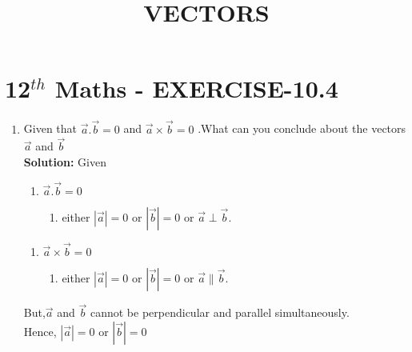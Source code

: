 \documentclass[10pt]{article}
\newcommand{\solution}{\noindent \textbf{Solution: }}
\providecommand{\abs}[1]{\left\vert#1\right\vert}
\begin{document}
\begin{center}
\title{\textbf{VECTORS}}
\date{\vspace{-5ex}} %
\maketitle
\end{center}

\section{12$^{th}$ Maths - EXERCISE-10.4}

\begin{enumerate}
\item Given that $\overrightarrow{a}.\overrightarrow{b}=0$ and $\overrightarrow{a}\times\overrightarrow{b}=0$ .What can you conclude about the vectors $\overrightarrow{a}$ and $\overrightarrow{b}$\\  

\solution
Given  

\begin{enumerate}
\item $\overrightarrow{a}.\overrightarrow{b}=0$
\begin{enumerate}
\item either $\abs{\overrightarrow{a}}=0$ or $\abs{\overrightarrow{b}}=0$ or $\overrightarrow{a}\perp\overrightarrow{b}$.
\end{enumerate}
\end{enumerate}
\begin{enumerate}
\item $\overrightarrow{a}\times\overrightarrow{b}=0$
\begin{enumerate}
\item either $\abs{\overrightarrow{a}}=0$ or $\abs{\overrightarrow{b}}=0$ or  $\overrightarrow{a}\parallel\overrightarrow{b}$.
\end{enumerate}
\end{enumerate}
But,$\overrightarrow{a}$ and $\overrightarrow{b}$ cannot be perpendicular and parallel simultaneously.\\
Hence, $\abs{\overrightarrow{a}}=0$ or $\abs{\overrightarrow{b}}=0$

\end{enumerate}
\end{document}

